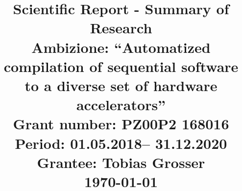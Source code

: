 \documentclass[manuscript,\review anonymous]{acmart}
\begin{document}
\title{Scientific Report - Summary of Research\\
Ambizione: ``Automatized compilation of sequential software to a diverse set of
hardware accelerators''\\
Grant number: PZ00P2 168016\\
Period: 01.05.2018– 31.12.2020\\
Grantee: Tobias Grosser\\
\today
}         %







\ifx\paperversion\paperversioncamera



\renewcommand\footnotetextcopyrightpermission[1]{} %
\fi

\maketitle
\newpage
\ifx\grammarly\grammarlyon 
\onecolumn 
\else 
\fi
\end{document}
